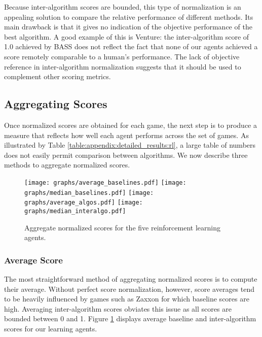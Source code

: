 \documentclass[twoside,11pt]{article}
\newcommand{\gamename}[1]{{\sc #1}}
\begin{document}
Because inter-algorithm scores are bounded, this type of normalization is an appealing solution to compare the relative performance of different methods.
Its main drawback is that it gives no indication of the objective performance of the best algorithm. 
A good example of this is \gamename{Venture}: the inter-algorithm score of 1.0 achieved by BASS does not reflect the fact that none of our agents achieved a score remotely comparable to a human's performance. The lack of objective reference in inter-algorithm normalization suggests that it should be used to complement other scoring metrics. 

\subsection{Aggregating Scores}

Once normalized scores are obtained for each game, the next step is to produce a measure that reflects how well each agent performs across the set of games. As illustrated by Table \ref{table:appendix:detailed_results:rl}, a large table of numbers does not easily permit comparison between algorithms. We now describe three methods to aggregate normalized scores.

\begin{figure}
\begin{center}
\texttt{[image: graphs/average\_baselines.pdf]}
\texttt{[image: graphs/median\_baselines.pdf]}
\texttt{[image: graphs/average\_algos.pdf]}
\texttt{[image: graphs/median\_interalgo.pdf]}
\caption{
Aggregate normalized scores for the five reinforcement learning agents.
\label{fig:evaluation:aggregate_scores}}
\end{center}
\end{figure}

\subsubsection{Average Score}

The most straightforward method of aggregating normalized scores is to compute their average. Without perfect score normalization, however, score averages tend to be heavily influenced by games such as \gamename{Zaxxon} for which baseline scores are high. Averaging inter-algorithm scores obviates this issue as all 
scores are bounded between 0 and 1. Figure \ref{fig:evaluation:aggregate_scores} displays average 
baseline and inter-algorithm scores for our learning agents.
\end{document}

